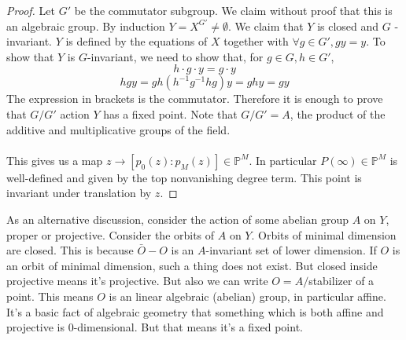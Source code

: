 \documentclass[12 pt]{article}
\theoremstyle{plain}
\theoremstyle{definition}
\theoremstyle{remark}
\begin{document}
\begin{proof}
Let $G'$ be the commutator subgroup. We claim without proof that this is an algebraic group. By induction $Y = X^{G'} \neq \emptyset$. We claim that $Y$ is closed and $G$ -invariant. $Y$ is defined by the equations of $X$ together with $\forall g \in G', gy = y$. To show that $Y$ is $G$-invariant, we need to show that, for $g\in G, h\in G'$,
\[           h \cdot g \cdot y = g \cdot y         \]
\[       hgy = gh (h^{-1}g^{-1} hg) y = gh y = gy        \]
The expression in brackets is the commutator. Therefore it is enough to prove that $G/G'$ action $Y$ has a fixed point. Note that $G/G' = A$, the product of the additive and multiplicative groups of the field. 
\\
\\
This gives us a map $z \to [p_0(z) : p_M(z)] \in \mathbb{P}^M$. In particular $P(\infty) \in \mathbb{P}^M$ is well-defined and given by the top nonvanishing degree term. This point is invariant under translation by $z$.
\end{proof}
As an alternative discussion, consider the action of some abelian group $A$ on $Y$, proper or projective. Consider the orbits of $A$ on $Y$. Orbits of minimal dimension are closed. This is because $\bar O - O$ is an $A$-invariant set of lower dimension. If $O$ is an orbit of minimal dimension, such a thing does not exist. But closed inside projective means it's projective. But also we can write $O = A/$stabilizer of a point. This means $O$ is an linear algebraic (abelian) group, in particular affine.
It's a basic fact of algebraic geometry that something which is both affine and projective is 0-dimensional. But that means it's a fixed point.
\end{document}
